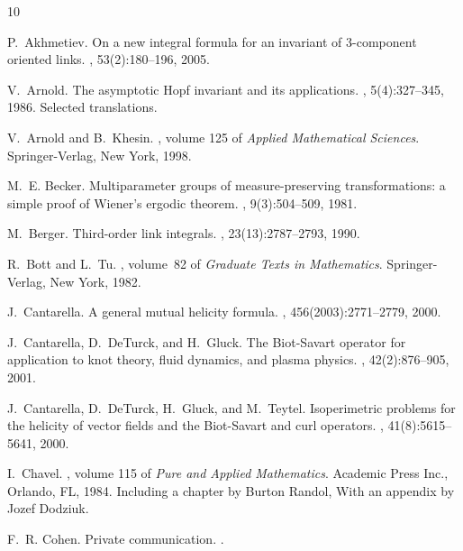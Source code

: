 \documentclass[12pt]{article}
\begin{document}
\begin{thebibliography}{10}

P.~Akhmetiev.
\newblock On a new integral formula for an invariant of 3-component oriented
  links.
, 53(2):180--196, 2005.

V.~Arnold.
\newblock The asymptotic {H}opf invariant and its applications.
, 5(4):327--345, 1986.
\newblock Selected translations.

V.~Arnold and B.~Khesin.
, volume 125 of {\em
  Applied Mathematical Sciences}.
\newblock Springer-Verlag, New York, 1998.

M.~E. Becker.
\newblock Multiparameter groups of measure-preserving transformations: a simple
  proof of {W}iener's ergodic theorem.
, 9(3):504--509, 1981.

M.~Berger.
\newblock Third-order link integrals.
, 23(13):2787--2793, 1990.

R.~Bott and L.~Tu.
, volume~82 of {\em
  Graduate Texts in Mathematics}.
\newblock Springer-Verlag, New York, 1982.

J.~Cantarella.
\newblock A general mutual helicity formula.
,
  456(2003):2771--2779, 2000.

J.~Cantarella, D.~DeTurck, and H.~Gluck.
\newblock The {B}iot-{S}avart operator for application to knot theory, fluid
  dynamics, and plasma physics.
, 42(2):876--905, 2001.

J.~Cantarella, D.~DeTurck, H.~Gluck, and M.~Teytel.
\newblock Isoperimetric problems for the helicity of vector fields and the
  {B}iot-{S}avart and curl operators.
, 41(8):5615--5641, 2000.

I.~Chavel.
, volume 115 of {\em Pure
  and Applied Mathematics}.
\newblock Academic Press Inc., Orlando, FL, 1984.
\newblock Including a chapter by Burton Randol, With an appendix by Jozef
  Dodziuk.

F.~R. Cohen.
\newblock Private communication.
.


\end{thebibliography}
\end{document}
